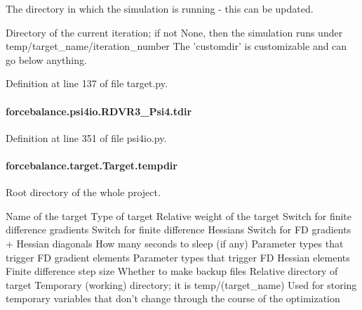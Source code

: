 The directory in which the simulation is running -\/ this can be updated. 

Directory of the current iteration; if not None, then the simulation runs under temp/target\-\_\-name/iteration\-\_\-number The 'customdir' is customizable and can go below anything.

Definition at line 137 of file target.\-py.

\hypertarget{classforcebalance_1_1psi4io_1_1RDVR3__Psi4_afba333b01de406679320bd268435fd94}{
\paragraph[{tdir}]{\setlength{\rightskip}{0pt plus 5cm}forcebalance.\-psi4io.\-R\-D\-V\-R3\-\_\-\-Psi4.\-tdir}}\label{classforcebalance_1_1psi4io_1_1RDVR3__Psi4_afba333b01de406679320bd268435fd94}


Definition at line 351 of file psi4io.\-py.

\hypertarget{classforcebalance_1_1target_1_1Target_aa1f01b5b78db253b5b66384ed11ed193}{
\paragraph[{tempdir}]{\setlength{\rightskip}{0pt plus 5cm}forcebalance.\-target.\-Target.\-tempdir\hspace{0.3cm}{\ttfamily [inherited]}}}\label{classforcebalance_1_1target_1_1Target_aa1f01b5b78db253b5b66384ed11ed193}


Root directory of the whole project. 

Name of the target Type of target Relative weight of the target Switch for finite difference gradients Switch for finite difference Hessians Switch for F\-D gradients + Hessian diagonals How many seconds to sleep (if any) Parameter types that trigger F\-D gradient elements Parameter types that trigger F\-D Hessian elements Finite difference step size Whether to make backup files Relative directory of target Temporary (working) directory; it is temp/(target\-\_\-name) Used for storing temporary variables that don't change through the course of the optimization 

